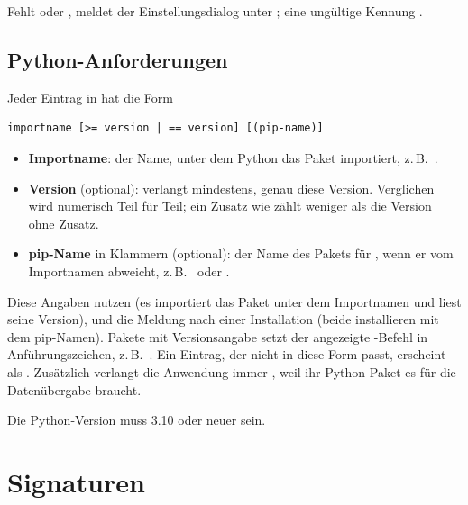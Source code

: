 Fehlt  oder , meldet der Einstellungsdialog unter 
; eine ungültige Kennung
 .

\subsection{Python-Anforderungen}\label{sec:verwaltung-requires}

Jeder Eintrag in  hat die Form

\begin{lstlisting}
importname [>= version | == version] [(pip-name)]
\end{lstlisting}

\begin{itemize}
  \item \textbf{Importname}: der Name, unter dem Python das Paket importiert,
        z.\,B.\ .
  \item \textbf{Version} (optional): \code{>=} verlangt mindestens, \code{==} genau diese
        Version. Verglichen wird numerisch Teil für Teil; ein Zusatz wie  zählt
        weniger als die Version ohne Zusatz.
  \item \textbf{pip-Name} in Klammern (optional): der Name des Pakets für , wenn er
        vom Importnamen abweicht, z.\,B.\ 
        oder .
\end{itemize}

Diese Angaben nutzen  (es importiert das Paket unter dem Importnamen und
liest seine Version),  und die Meldung nach einer Installation (beide
installieren mit dem pip-Namen). Pakete mit Versionsangabe setzt der angezeigte -Befehl
in Anführungszeichen, z.\,B.\ . Ein Eintrag, der nicht in
diese Form passt, erscheint als . Zusätzlich verlangt die Anwendung
immer , weil ihr Python-Paket  es für die Datenübergabe braucht.

Die Python-Version muss 3.10 oder neuer sein.

\section{Signaturen}\label{sec:verwaltung-signaturen}

